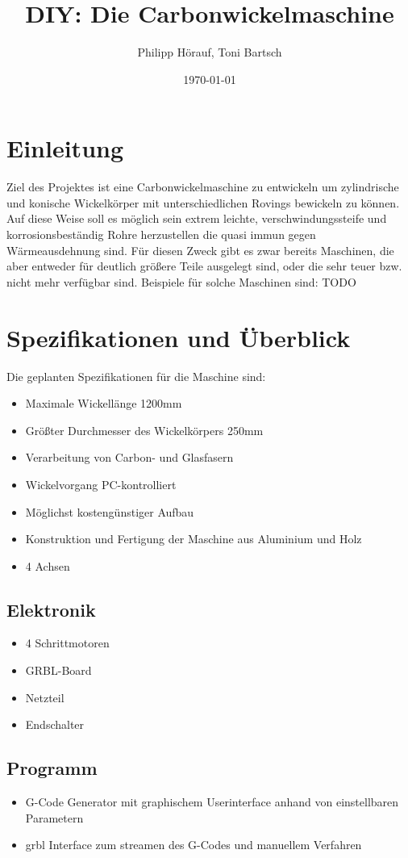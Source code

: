 \documentclass[12pt, a4paper, ngerman]{article}
\date{\today}
\author{Philipp Hörauf, Toni Bartsch}
\title{DIY: Die Carbonwickelmaschine}
\begin{document}
\maketitle
\newpage
\tableofcontents
\newpage
\section{Einleitung}
Ziel des Projektes ist eine Carbonwickelmaschine zu entwickeln um zylindrische und konische Wickelkörper mit unterschiedlichen Rovings bewickeln zu können. Auf diese Weise soll es möglich sein extrem leichte, verschwindungssteife und korrosionsbeständig Rohre herzustellen die quasi immun gegen Wärmeausdehnung sind. Für diesen Zweck gibt es zwar bereits Maschinen, die aber entweder für deutlich größere Teile ausgelegt sind, oder die sehr teuer bzw. nicht mehr verfügbar sind. Beispiele für solche Maschinen sind: TODO

\section{Spezifikationen und Überblick}
Die geplanten Spezifikationen für die Maschine sind:

\begin{itemize}
    \item Maximale Wickellänge 1200mm
    \item Größter Durchmesser des Wickelkörpers 250mm
    \item Verarbeitung von Carbon- und Glasfasern
    \item Wickelvorgang PC-kontrolliert
    \item Möglichst kostengünstiger Aufbau
    \item Konstruktion und Fertigung der Maschine aus Aluminium und Holz
    \item 4 Achsen
\end{itemize}

\subsection{Elektronik}
\begin{itemize}
    \item 4 Schrittmotoren
    \item GRBL-Board
    \item Netzteil
    \item Endschalter
\end{itemize}


\subsection{Programm}
\begin{itemize}
    \item G-Code Generator mit graphischem Userinterface anhand von einstellbaren Parametern
    \item grbl Interface zum streamen des G-Codes und manuellem Verfahren
\end{itemize}
\end{document}

